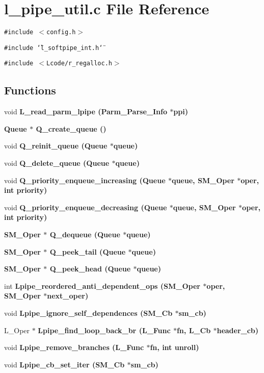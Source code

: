 \section{l\_\-pipe\_\-util.c File Reference}
\label{l__pipe__util_8c}
{\tt \#include $<$config.h$>$}\par
{\tt \#include \char`\"{}l\_\-softpipe\_\-int.h\char`\"{}}\par
{\tt \#include $<$Lcode/r\_\-regalloc.h$>$}\par
\subsection*{Functions}
\begin{CompactItemize}
\item 
void \bf{L\_\-read\_\-parm\_\-lpipe} (Parm\_\-Parse\_\-Info $\ast$ppi)
\item 
\bf{Queue} $\ast$ \bf{Q\_\-create\_\-queue} ()
\item 
void \bf{Q\_\-reinit\_\-queue} (\bf{Queue} $\ast$queue)
\item 
void \bf{Q\_\-delete\_\-queue} (\bf{Queue} $\ast$queue)
\item 
void \bf{Q\_\-priority\_\-enqueue\_\-increasing} (\bf{Queue} $\ast$queue, \bf{SM\_\-Oper} $\ast$oper, int priority)
\item 
void \bf{Q\_\-priority\_\-enqueue\_\-decreasing} (\bf{Queue} $\ast$queue, \bf{SM\_\-Oper} $\ast$oper, int priority)
\item 
\bf{SM\_\-Oper} $\ast$ \bf{Q\_\-dequeue} (\bf{Queue} $\ast$queue)
\item 
\bf{SM\_\-Oper} $\ast$ \bf{Q\_\-peek\_\-tail} (\bf{Queue} $\ast$queue)
\item 
\bf{SM\_\-Oper} $\ast$ \bf{Q\_\-peek\_\-head} (\bf{Queue} $\ast$queue)
\item 
int \bf{Lpipe\_\-reordered\_\-anti\_\-dependent\_\-ops} (\bf{SM\_\-Oper} $\ast$oper, \bf{SM\_\-Oper} $\ast$next\_\-oper)
\item 
void \bf{Lpipe\_\-ignore\_\-self\_\-dependences} (\bf{SM\_\-Cb} $\ast$sm\_\-cb)
\item 
L\_\-Oper $\ast$ \bf{Lpipe\_\-find\_\-loop\_\-back\_\-br} (L\_\-Func $\ast$fn, L\_\-Cb $\ast$\bf{header\_\-cb})
\item 
void \bf{Lpipe\_\-remove\_\-branches} (L\_\-Func $\ast$fn, int unroll)
\item 
void \bf{Lpipe\_\-cb\_\-set\_\-iter} (\bf{SM\_\-Cb} $\ast$sm\_\-cb)
\item 

\end{CompactItemize}
